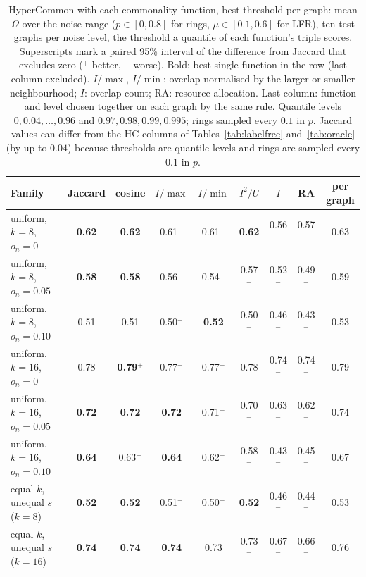 \begin{table}[t]
\caption{HyperCommon with each commonality function, best threshold per graph: mean $\Omega$ over the noise range ($p\in[0,0.8]$ for rings, $\mu\in[0.1,0.6]$ for LFR), ten test graphs per noise level, the threshold a quantile of each function's triple scores. Superscripts mark a paired 95\% interval of the difference from Jaccard that excludes zero ($^+$ better, $^-$ worse). Bold: best single function in the row (last column excluded). $I/\max$, $I/\min$: overlap normalised by the larger or smaller neighbourhood; $I$: overlap count; RA: resource allocation. Last column: function and level chosen together on each graph by the same rule. Quantile levels $0,0.04,\dots,0.96$ and $0.97,0.98,0.99,0.995$; rings sampled every $0.1$ in $p$. Jaccard values can differ from the HC columns of Tables~\ref{tab:labelfree} and~\ref{tab:oracle} (by up to $0.04$) because thresholds are quantile levels and rings are sampled every $0.1$ in $p$.}
\label{tab:familyoracle}
\scriptsize
\begin{ruledtabular}
\begin{tabular}{lccccccc|c}
Family & Jaccard & cosine & $I/\max$ & $I/\min$ & $I^2/U$ & $I$ & RA & per graph \\
\hline
uniform, $k{=}8$, $o_n{=}0$ & \textbf{0.62} & \textbf{0.62} & 0.61$^-$ & 0.61$^-$ & \textbf{0.62} & 0.56$^-$ & 0.57$^-$ & 0.63 \\
uniform, $k{=}8$, $o_n{=}0.05$ & \textbf{0.58} & \textbf{0.58} & 0.56$^-$ & 0.54$^-$ & 0.57$^-$ & 0.52$^-$ & 0.49$^-$ & 0.59 \\
uniform, $k{=}8$, $o_n{=}0.10$ & 0.51 & 0.51 & 0.50$^-$ & \textbf{0.52} & 0.50$^-$ & 0.46$^-$ & 0.43$^-$ & 0.53 \\
uniform, $k{=}16$, $o_n{=}0$ & 0.78 & \textbf{0.79$^+$} & 0.77$^-$ & 0.77$^-$ & 0.78 & 0.74$^-$ & 0.74$^-$ & 0.79 \\
uniform, $k{=}16$, $o_n{=}0.05$ & \textbf{0.72} & \textbf{0.72} & \textbf{0.72} & 0.71$^-$ & 0.70$^-$ & 0.63$^-$ & 0.62$^-$ & 0.74 \\
uniform, $k{=}16$, $o_n{=}0.10$ & \textbf{0.64} & 0.63$^-$ & \textbf{0.64} & 0.62$^-$ & 0.58$^-$ & 0.43$^-$ & 0.45$^-$ & 0.67 \\
equal $k$, unequal $s$ ($k{=}8$) & \textbf{0.52} & \textbf{0.52} & 0.51$^-$ & 0.50$^-$ & \textbf{0.52} & 0.46$^-$ & 0.44$^-$ & 0.53 \\
equal $k$, unequal $s$ ($k{=}16$) & \textbf{0.74} & \textbf{0.74} & \textbf{0.74} & 0.73 & 0.73$^-$ & 0.67$^-$ & 0.66$^-$ & 0.76 \\

\end{tabular}
\end{ruledtabular}
\end{table}
